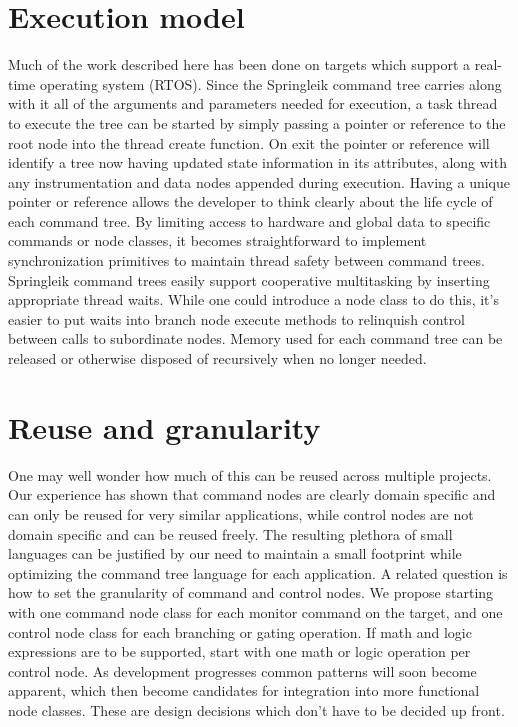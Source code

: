 \documentclass[a4paper,10pt]{article}
\begin{document}
\section{Execution model}
Much of the work described here has been done on targets which support a real-time operating system (RTOS). Since the Springleik command tree carries along with it all of the arguments and parameters needed for execution, a task thread to execute the tree can be started by simply passing a pointer or reference to the root node into the thread create function. On exit the pointer or reference will identify a tree now having updated state information in its attributes, along with any instrumentation and data nodes appended during execution. Having a unique pointer or reference allows the developer to think clearly about the life cycle of each command tree. By limiting access to hardware and global data to specific commands or node classes, it becomes straightforward to implement synchronization primitives to maintain thread safety between command trees. Springleik command trees easily support cooperative multitasking by inserting appropriate thread waits. While one could introduce a node class to do this, it's easier to put waits into branch node execute methods to relinquish control between calls to subordinate nodes. Memory used for each command tree can be released or otherwise disposed of recursively when no longer needed.

\section{Reuse and granularity}
One may well wonder how much of this can be reused across multiple projects. Our experience has shown that command nodes are clearly domain specific and can only be reused for very similar applications, while control nodes are not domain specific and can be reused freely. The resulting plethora of small languages can be justified by our need to maintain a small footprint while optimizing the command tree language for each application. A related question is how to set the granularity of command and control nodes. We propose starting with one command node class for each monitor command on the target, and one control node class for each branching or gating operation. If math and logic expressions are to be supported, start with one math or logic operation per control node. As development progresses common patterns will soon become apparent, which then become candidates for integration into more functional node classes. These are design decisions which don't have to be decided up front.
\end{document}
